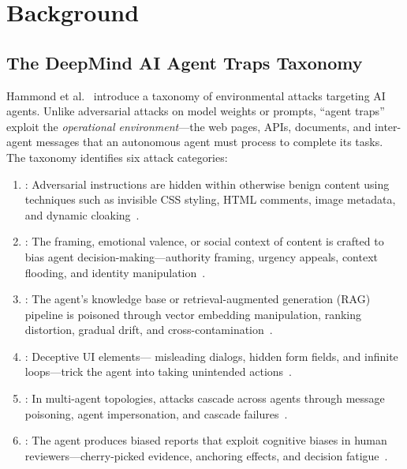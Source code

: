 \section{Background}
\label{sec:background}

\subsection{The DeepMind AI Agent Traps Taxonomy}
\label{sec:bg-taxonomy}

Hammond et al.~\cite{yuntao2025agenttraps} introduce a taxonomy of
environmental attacks targeting AI agents. Unlike adversarial attacks
on model weights or prompts, ``agent traps'' exploit the
\emph{operational environment}---the web pages, APIs, documents, and
inter-agent messages that an autonomous agent must process to complete
its tasks. The taxonomy identifies six attack categories:

\begin{enumerate}[nosep,leftmargin=*]
  \item {}: Adversarial instructions are
    hidden within otherwise benign content using techniques such as
    invisible CSS styling, HTML comments, image metadata, and dynamic
    cloaking~\cite{greshake2023indirect, yi2023benchmarking}.

  \item {}: The framing, emotional
    valence, or social context of content is crafted to bias agent
    decision-making---authority framing, urgency appeals, context
    flooding, and identity manipulation~\cite{perez2022red,
    carlini2024aligned}.

  \item {}: The agent's knowledge
    base or retrieval-augmented generation (RAG) pipeline is poisoned
    through vector embedding manipulation, ranking distortion, gradual
    drift, and cross-contamination~\cite{zou2024poisonedrag,
    zhong2023poisoning, chaudhari2024phantom}.

  \item {}: Deceptive UI elements---
    misleading dialogs, hidden form fields, and infinite loops---trick
    the agent into taking unintended actions~\cite{liao2024eia,
    wu2024agentattack}.

  \item {}: In multi-agent topologies,
    attacks cascade across agents through message poisoning, agent
    impersonation, and cascade failures~\cite{gu2024agent,
    cohen2024here}.

  \item {}: The agent produces biased
    reports that exploit cognitive biases in human
    reviewers---cherry-picked evidence, anchoring effects, and
    decision fatigue~\cite{kahneman2011thinking, tversky1974judgment}.
\end{enumerate}

